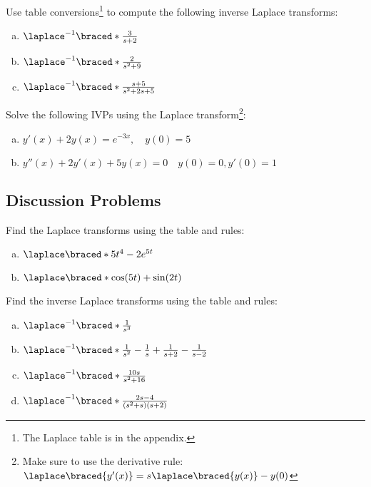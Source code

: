   \begin{question}
    Use table conversions\footnote{The Laplace table is in the appendix.} to compute the following inverse Laplace transforms:
    \begin{enumerate}[(a)]
    \item \(\laplace^{-1}\braced*{\frac{3}{s+2}} \) \solspace{1in}
    \item \(\laplace^{-1}\braced*{\frac{2}{s^{2} + 9}} \) \solspace{1in}
    \item \(\laplace^{-1}\braced*{\frac{s+5}{ s^{2} + 2s + 5}} \) \solspace{2in}
    \end{enumerate}
  \end{question}

  \begin{question}
    Solve the following IVPs using the Laplace transform\footnote{Make sure to use the derivative rule:\(\laplace\braced{y'(x)} = s\laplace\braced{y(x)} - y(0)\)}:
    \begin{enumerate}[(a)]
    \item \(y'(x) + 2y(x) = e^{-3x}, \quad y(0) = 5\)\solspace{3in}
    \item \(y''(x) + 2y'(x) + 5y(x) = 0 \quad y(0) = 0, y'(0)=1\)\solspace{3in}
    \end{enumerate}
  \end{question}


\subsection*{Discussion Problems}

\begin{question}
Find the Laplace transforms using the table and rules:
\begin{enumerate}[(a)]
  \item $\laplace\braced*{5t^4-2e^{5t}}$
  \item $\laplace \braced*{ \cos(5t)+\sin(2t) }$
  \end{enumerate}
\end{question}

\begin{question}
Find the inverse Laplace transforms using the table and rules:
 \begin{enumerate}[(a)]
 \item $\laplace^{-1}\braced*{ \frac{1}{s^3} }$
 \item $\laplace^{-1}\braced*{\frac{1}{s^2}-\frac{1}{s} +\frac{1}{s+2} -\frac{1}{s-2}}$
 \item $\laplace^{-1}\braced*{\frac{10s}{s^2+16}}$
 \item $\laplace^{-1}\braced*{\frac{2s-4}{(s^2+s)(s+2)}}$
 \end{enumerate}
\end{question}

